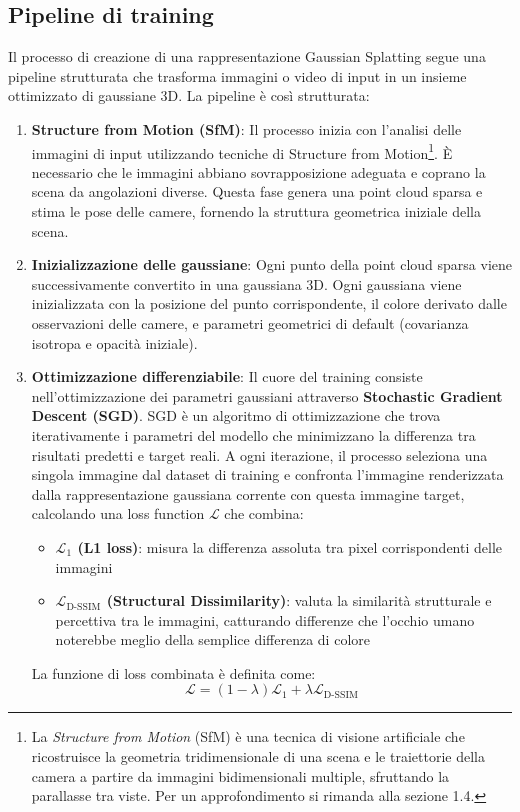 \subsection{Pipeline di training}
Il processo di creazione di una rappresentazione Gaussian Splatting segue una pipeline strutturata che trasforma immagini o video di input in un insieme ottimizzato di gaussiane 3D.
La pipeline è così strutturata:
\begin{enumerate}
    \item \textbf{Structure from Motion (SfM)}: Il processo inizia con l'analisi delle immagini di input utilizzando tecniche di Structure from Motion\footnote{La \textit{Structure from Motion} (SfM) è una tecnica di visione artificiale che ricostruisce la geometria tridimensionale di una scena e le traiettorie della camera a partire da immagini bidimensionali multiple, sfruttando la parallasse tra viste. Per un approfondimento si rimanda alla sezione 1.4.}. È necessario che le immagini abbiano sovrapposizione adeguata e coprano la scena da angolazioni diverse. Questa fase genera una point cloud sparsa e stima le pose delle camere, fornendo la struttura geometrica iniziale della scena.

    \item \textbf{Inizializzazione delle gaussiane}: Ogni punto della point cloud sparsa viene successivamente convertito in una gaussiana 3D. Ogni gaussiana viene inizializzata con la posizione del punto corrispondente, il colore derivato dalle osservazioni delle camere, e parametri geometrici di default (covarianza isotropa e opacità iniziale).
    
    \item \textbf{Ottimizzazione differenziabile}: Il cuore del training consiste nell'ottimizzazione dei parametri gaussiani attraverso \textbf{Stochastic Gradient Descent (SGD)}. SGD è un algoritmo di ottimizzazione che trova iterativamente i parametri del modello che minimizzano la differenza tra risultati predetti e target reali.\newline
    A ogni iterazione, il processo seleziona una singola immagine dal dataset di training e confronta l'immagine renderizzata dalla rappresentazione gaussiana corrente con questa immagine target, calcolando una loss function $\mathcal{L}$ che combina:
        \begin{itemize}
            \item \textbf{$\mathcal{L}_1$ (L1 loss)}: misura la differenza assoluta tra pixel corrispondenti delle immagini
            \item \textbf{$\mathcal{L}_{\text{D-SSIM}}$ (Structural Dissimilarity)}: valuta la similarità strutturale e percettiva tra le immagini, catturando differenze che l'occhio umano noterebbe meglio della semplice differenza di colore
        \end{itemize}
        La funzione di loss combinata è definita come:
        \begin{equation}
            \mathcal{L} = (1-\lambda)\mathcal{L}_1 + \lambda \mathcal{L}_{\text{D-SSIM}}
        \end{equation}
        

\end{enumerate}

